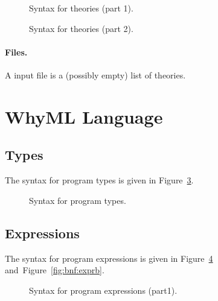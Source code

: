 \begin{figure}
  \begin{center}\framebox{}\end{center}
  \caption{Syntax for theories (part 1).}
\label{fig:bnf:theorya}
\end{figure}

\begin{figure}
  \begin{center}\framebox{}\end{center}
  \caption{Syntax for theories (part 2).}
\label{fig:bnf:theoryb}
\end{figure}

\paragraph{Files.}
A \why input file is a (possibly empty) list of theories.
\begin{center}\framebox{}\end{center}


\clearpage
\section{WhyML Language}\label{sec:syntax:whyml}

\subsection{Types}

The syntax for program types is given in Figure~\ref{fig:bnf:typev}.
\begin{figure}
  \begin{center}\framebox{}\end{center}
  \caption{Syntax for program types.}
\label{fig:bnf:typev}
\end{figure}

\subsection{Expressions}

The syntax for program expressions is given in
Figure~\ref{fig:bnf:expra} and~Figure~\ref{fig:bnf:exprb}.
\begin{figure}
  \begin{center}\framebox{}\end{center}
  \caption{Syntax for program expressions (part1).}
\label{fig:bnf:expra}
\end{figure}

